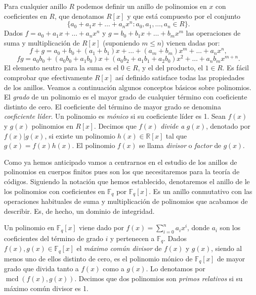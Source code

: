 Para cualquier anillo \(R\) podemos definir un anillo de polinomios en \(x\) con coeficientes en \(R\), que denotamos \(R[x]\) y que está compuesto por el conjunto
\[
  \{a_0 + a_1x + \dots + a_nx^n : a_0, a_1, \dots, a_n \in R\}.
\]
Dados \(f = a_0 + a_1x + \dots + a_nx^n\) y \(g = b_0 + b_1x + \dots + b_mx^m\) las operaciones de suma y multiplicación de \(R[x]\) (suponiendo \(m \leq n\)) vienen dadas por:
\[
  f + g = a_0 + b_0 + (a_1 + b_1)x + \dots + (a_m + b_m)x^m + \dots + a_nx^n,
\]
\[
  fg = a_0b_0 + (a_0b_0 + a_1b_0)x + (a_0b_2 + a_1b_1 + a_2b_0)x^2 + \dots + a_nb_mx^{m+n}.
\]
El elemento neutro para la suma es el \(0 \in R\), y el del producto, el \(1 \in R\).
Es fácil comprobar que efectivamente \(R[x]\) así definido satisface todas las propiedades de los anillos.
Veamos a continuación algunos conceptos básicos sobre polinomios.
El \textit{grado} de un polinomio es el mayor grado de cualquier término con coeficiente distinto de cero.
El coeficiente del término de mayor grado se denomina \textit{coeficiente líder}.
Un polinomio es \textit{mónico} si su coeficiente líder es 1.
Sean \(f(x)\) y \(g(x)\) polinomios en \(R[x]\).
Decimos que \(f(x)\) \textit{divide a} \(g(x)\), denotado por \(f(x) | g(x)\), si existe un polinomio \(h(x) \in \mathbb R[x]\) tal que \(g(x) = f(x)h(x)\).
El polinomio \(f(x)\) se llama \textit{divisor} o \textit{factor} de \(g(x)\).

Como ya hemos anticipado vamos a centrarnos en el estudio de los anillos de polinomios en cuerpos finitos pues son los que necesitaremos para la teoría de códigos.
Siguiendo la notación que hemos establecido, denotaremos el anillo de le los polinomios con coeficientes en \(\mathbb F_q\) por \(\mathbb F_q[x]\).
Es un anillo conmutativo con las operaciones habituales de suma y multiplicación de polinomios que acabamos de describir.
Es, de hecho, un dominio de integridad.

Un polinomio en \(\mathbb F_q[x]\) viene dado por \(f(x) = \sum_{i=0}^n a_ix^i\), donde \(a_i\) son los coeficientes del término de grado \(i\) y pertenecen a \(\mathbb F_q\).
Dados \(f(x), g(x) \in \mathbb F_q[x]\) el \textit{máximo común divisor} de \(f(x)\) y \(g(x)\), siendo al menos uno de ellos distinto de cero, es el polinomio mónico de \(\mathbb F_q[x]\) de mayor grado que divida tanto a \(f(x)\) como a \(g(x)\).
Lo denotamos por \(\operatorname{mcd}(f(x), g(x))\).
Decimos que dos polinomios son \textit{primos relativos} si su máximo común divisor es 1.

